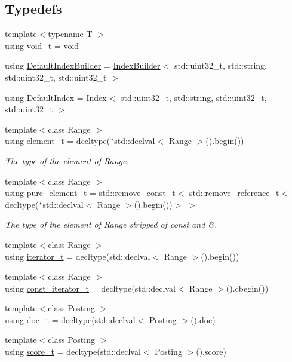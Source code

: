 \subsection*{Typedefs}
\begin{DoxyCompactItemize}
\item 
{\footnotesize template$<$typename T $>$ }\\using \hyperlink{namespaceirkit_ad3b30e41bd53e61f81bbd892123abe1a}{void\+\_\+t} = void
\item 
using \hyperlink{namespaceirkit_aefd5a5c2f1136e9c2224a4b4d659d4a9}{Default\+Index\+Builder} = \hyperlink{classirkit_1_1IndexBuilder}{Index\+Builder}$<$ std\+::uint32\+\_\+t, std\+::string, std\+::uint32\+\_\+t, std\+::uint32\+\_\+t $>$
\item 
using \hyperlink{namespaceirkit_a6f3d282716b38521a43b65100a6d337b}{Default\+Index} = \hyperlink{classirkit_1_1Index}{Index}$<$ std\+::uint32\+\_\+t, std\+::string, std\+::uint32\+\_\+t, std\+::uint32\+\_\+t $>$
\item 
{\footnotesize template$<$class Range $>$ }\\using \hyperlink{namespaceirkit_a40deb8b0d47ecaada4b47270b97d5469}{element\+\_\+t} = decltype($\ast$std\+::declval$<$ Range $>$().begin())
\begin{DoxyCompactList}\small\item\em The type of the element of Range. \end{DoxyCompactList}\item 
{\footnotesize template$<$class Range $>$ }\\using \hyperlink{namespaceirkit_afcffab67300c5c703cb38a363c9a6f1d}{pure\+\_\+element\+\_\+t} = std\+::remove\+\_\+const\+\_\+t$<$ std\+::remove\+\_\+reference\+\_\+t$<$ decltype($\ast$std\+::declval$<$ Range $>$().begin())$>$ $>$
\begin{DoxyCompactList}\small\item\em The type of the element of Range stripped of {\ttfamily const} and {\ttfamily \&}. \end{DoxyCompactList}\item 
{\footnotesize template$<$class Range $>$ }\\using \hyperlink{namespaceirkit_af390a50be8f636e7239c650e5043c56f}{iterator\+\_\+t} = decltype(std\+::declval$<$ Range $>$().begin())
\item 
{\footnotesize template$<$class Range $>$ }\\using \hyperlink{namespaceirkit_a4b1668583041117eb42c1b5a1091b804}{const\+\_\+iterator\+\_\+t} = decltype(std\+::declval$<$ Range $>$().cbegin())
\item 
{\footnotesize template$<$class Posting $>$ }\\using \hyperlink{namespaceirkit_a595d83053e112c98ab2a1b65e5dd74be}{doc\+\_\+t} = decltype(std\+::declval$<$ Posting $>$().doc)
\item 
{\footnotesize template$<$class Posting $>$ }\\using \hyperlink{namespaceirkit_a754dabe3346f950c948e7596d9d46c71}{score\+\_\+t} = decltype(std\+::declval$<$ Posting $>$().score)
\end{DoxyCompactItemize}
